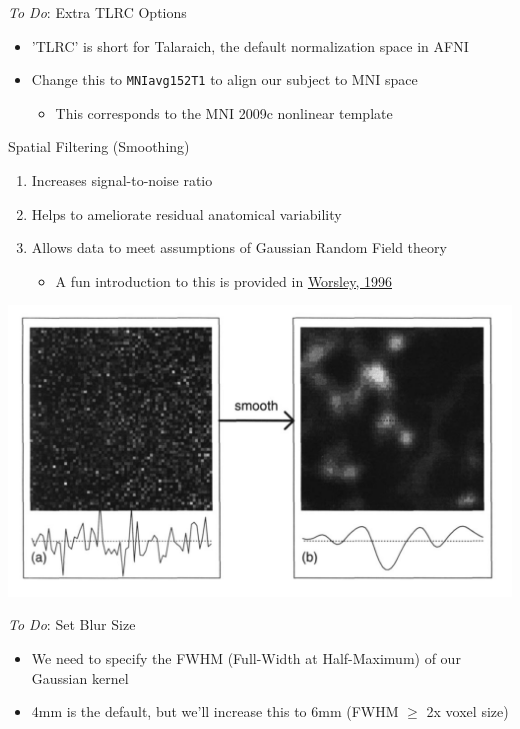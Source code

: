 \documentclass[t,12pt]{beamer}
\begin{document}
\begin{frame}{\emph{To Do}: Extra TLRC Options}
\vspace{10pt}
\begin{itemize}
\setlength\itemsep{1em}
\item 'TLRC' is short for Talaraich, the default normalization space in AFNI
\item Change this to \texttt{MNI\textunderscore{}avg152T1} to align our subject to MNI space
\vspace{4pt}
\begin{itemize}
\item This corresponds to the MNI 2009c nonlinear template
\end{itemize}
\end{itemize}
\end{frame}

\begin{frame}{Spatial Filtering (Smoothing)}
\vspace{10pt}
\begin{enumerate}
\setlength\itemsep{1em}
\item Increases signal-to-noise ratio
\item Helps to ameliorate residual anatomical variability
\item Allows data to meet assumptions of Gaussian Random Field theory
\vspace{4pt}
\begin{itemize}
\item A fun introduction to this is provided in \href{http://www.fil.ion.ucl.ac.uk/~wpenny/mbi/chance3.pdf}{Worsley, 1996}
\end{itemize}
\end{enumerate}
\vspace{4pt}
\centering
\includegraphics[width=.65\textwidth]{images/gaussian_smoothing.png} \\
\end{frame}

\begin{frame}{\emph{To Do}: Set Blur Size}
\vspace{10pt}
\begin{itemize}
\setlength\itemsep{1em}
\item We need to specify the FWHM (Full-Width at Half-Maximum) of our Gaussian kernel
\item 4mm is the default, but we'll increase this to 6mm (FWHM $\geq$ 2x voxel size)
\end{itemize}
\end{frame}
\end{document}

